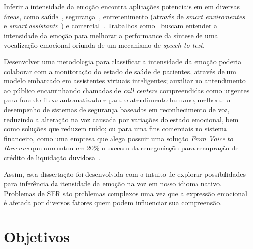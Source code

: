 
Inferir a intensidade da emoção encontra aplicações potenciais em em diversas áreas, como saúde~\cite{1}, segurança~\cite{4}, entretenimento (através de \textit{smart enviromentes}~\cite{alexa1} e \textit{smart assistants}~\cite{alexa2}) e comercial~\cite{bsignal1, bsignal2}. Trabalhos como~\cite{63} buscam entender a intensidade da emoção para melhorar a performance da síntese de uma vocalização emocional oriunda de um mecanismo de \textit{speech to text}.

Desenvolver uma metodologia para classificar a intensidade da emoção poderia colaborar com a monitoração do estado de saúde de pacientes, através de um modelo embarcado em assistentes virtuais inteligentes; auxiliar no antendimento ao público encaminhando chamadas de \textit{call centers} compreendidas como urgentes para fora do fluxo automatizado e para o atendimento humano; melhorar o desempenho de sistemas de segurança baseados em reconhecimento de voz, reduzindo a alteração na voz causada por variações do estado emocional, bem como soluções que reduzem ruído; ou para uma fins comerciais no sistema financeiro, como uma empresa que alega possuir uma solução \textit{From Voice to Revenue} que aumentou em 20\% o sucesso da renegociação para recupração de crédito de liquidação duvidosa~\cite{bsignal0}.

Assim, esta dissertação foi desenvolvida com o intuito de explorar possibilidades para inferência da itensidade da emoção na voz em nosso idioma nativo. Problemas de \acrshort{SER} são problemas complexos uma vez que a expressão emocional é afetada por diversos fatores quem podem influenciar sua compreensão.

\section{Objetivos}


